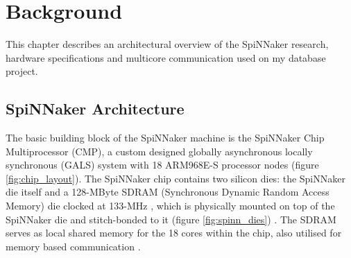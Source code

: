 \chapter{Background}
\label{cha:background}
This chapter describes an architectural overview of the SpiNNaker research, hardware specifications and multicore communication used on my database project.

\section{SpiNNaker Architecture}
\label{sec:spinn_arch}

The basic building block of the SpiNNaker machine is the SpiNNaker Chip Multiprocessor (CMP), a custom designed globally asynchronous locally synchronous (GALS) system \cite{painkras} with 18 ARM968E-S processor nodes \cite{impacttraffic} (figure \ref{fig:chip_layout}). 
The SpiNNaker chip contains two silicon dies: the SpiNNaker die itself and a 128-MByte SDRAM (Synchronous Dynamic Random Access Memory) die clocked at 133-MHz \cite{gals}, which is physically mounted on top of the SpiNNaker die and stitch-bonded to it (figure \ref{fig:spinn_dies}) \cite{spinnchip}. The SDRAM serves as local shared memory for the 18 cores within the chip, also utilised for memory based communication \cite{datasheet}. 

